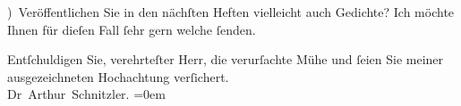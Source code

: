 ) Veröffentlichen Sie in den nächſten Heften vielleicht auch Gedichte? Ich möchte
                  {\pb}Ihnen für dieſen Fall{ }ſehr gern welche{ }ſenden.\pend
           
\pstart
           Entſchuldigen Sie, verehrteſter Herr, die verurſachte Mühe und{ }ſeien Sie meiner
               ausgezeichneten Hochachtung verſichert.{\\[\baselineskip]}\spacefill\mbox{Dr Arthur Schnitzler.}\pend
           \leftskip=0em{}\endnumbering{}  \newcommand{\dateiname}{L00076}\newcommand{\titel}{Arthur Schnitzler an Wilhelm Bölsche, 24. 2. 1892}\newcommand{\editorInnen}{Martin Anton Müller und Gerd-Hermann Susen}
